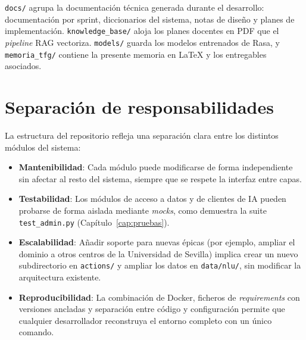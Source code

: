 \texttt{docs/} agrupa la documentación técnica generada durante el desarrollo: documentación por sprint, diccionarios del sistema, notas de diseño y planes de implementación. \texttt{knowledge\_base/} aloja los planes docentes en PDF que el \textit{pipeline} RAG vectoriza. \texttt{models/} guarda los modelos entrenados de Rasa, y \texttt{memoria\_tfg/} contiene la presente memoria en LaTeX y los entregables asociados.

\section{Separación de responsabilidades}\label{sec:separacion-responsabilidades}

La estructura del repositorio refleja una separación clara entre los distintos módulos del sistema:

\begin{itemize}
    \item \textbf{Mantenibilidad}: Cada módulo puede modificarse de forma independiente sin afectar al resto del sistema, siempre que se respete la interfaz entre capas.
    \item \textbf{Testabilidad}: Los módulos de acceso a datos y de clientes de IA pueden probarse de forma aislada mediante \textit{mocks}, como demuestra la suite \texttt{test\_admin.py} (Capítulo~\ref{cap:pruebas}).
    \item \textbf{Escalabilidad}: Añadir soporte para nuevas épicas (por ejemplo, ampliar el dominio a otros centros de la Universidad de Sevilla) implica crear un nuevo subdirectorio en \texttt{actions/} y ampliar los datos en \texttt{data/nlu/}, sin modificar la arquitectura existente.
    \item \textbf{Reproducibilidad}: La combinación de Docker, ficheros de \textit{requirements} con versiones ancladas y separación entre código y configuración permite que cualquier desarrollador reconstruya el entorno completo con un único comando.
\end{itemize}
